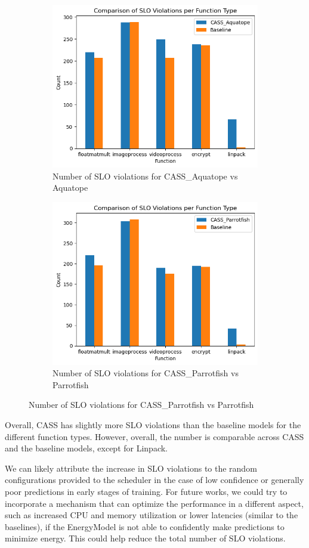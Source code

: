 \documentclass[times, 10pt,twocolumn]{article}
\begin{document}
\begin{figure}[H] %
   \centering
   \begin{subfigure}[b]{0.5\textwidth} %
         \centering
         \includegraphics[width=0.6\linewidth]{imgs/final_experiment_plots/duration_comparison/aquatope.png}
         \caption{Number of SLO violations for CASS\_Aquatope vs Aquatope}
         \label{fig:cassvsaquatope_slo}
   \end{subfigure}
   \begin{subfigure}[b]{0.5\textwidth} %
         \centering
         \includegraphics[width=0.6\linewidth]{imgs/final_experiment_plots/duration_comparison/parrotfish.png}
         \caption{Number of SLO violations for CASS\_Parrotfish vs Parrotfish}
         \label{fig:cassvsparrotfish_slo}
   \end{subfigure}
   \end{figure}

Overall, CASS has slightly more SLO violations than the baseline models for the different function types. However, overall, the number is comparable across CASS and the baseline models, except for Linpack. 

We can likely attribute the increase in SLO violations to the random configurations provided to the scheduler in the case of low confidence or generally poor predictions in early stages of training. For future works, we could try to incorporate a mechanism that can optimize the performance in a different aspect, such as increased CPU and memory utilization or lower latencies (similar to the baselines), if the EnergyModel is not able to confidently make predictions to minimize energy. This could help reduce the total number of SLO violations. 
\end{document}
